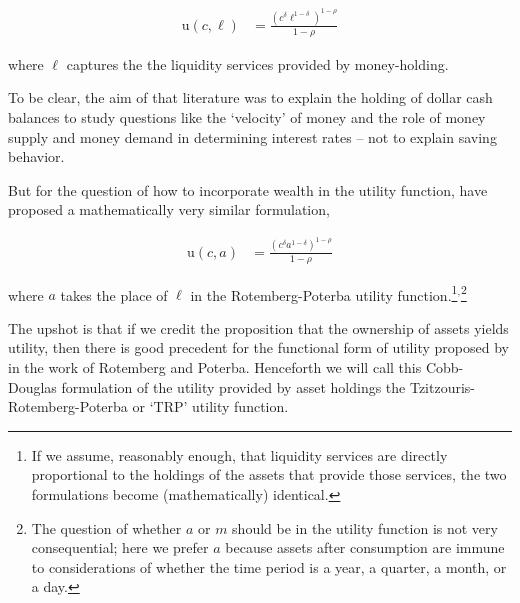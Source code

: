 \documentclass{article}
\newcommand{\CRRA}{\rho}
\newcommand{\uFunc}{\mathrm{u}}
\newcommand{\cNrm}{c}
\newcommand{\aNrm}{a}
\newcommand{\mNrm}{m}
\begin{document}
\begin{align}
    \uFunc(\cNrm,\ell) & = \frac{\left(
        \cNrm^{\delta}\ell^{1-\delta}
        \right)^{1-\CRRA}}{1-\CRRA}
\end{align}

where $\ell$ captures the the liquidity services provided by money-holding.

To be clear, the aim of that literature was to explain the holding of dollar cash balances to study questions like the `velocity' of money and the role of money supply and money demand in determining interest rates -- not to explain saving behavior.

But for the question of how to incorporate wealth in the utility function, \cite{Tzitzouris_2024} have proposed a mathematically very similar formulation,

\begin{align}
    \uFunc(\cNrm,\aNrm) & = \frac{\left(
        \cNrm^{\delta}\aNrm^{1-\delta}
        \right)^{1-\CRRA}}{1-\CRRA}
\end{align}

where $\aNrm$ takes the place of $\ell$ in the Rotemberg-Poterba utility function.\footnote{If we assume, reasonably enough, that liquidity services are directly proportional to the holdings of the assets that provide those services, the two formulations become (mathematically) identical.}$^{,}$\footnote{The question of whether $\aNrm$ or $\mNrm$ should be in the utility function is not very consequential; here we prefer $\aNrm$ because assets after consumption are immune to considerations of whether the time period is a year, a quarter, a month, or a day.}

The upshot is that if we credit the proposition that the ownership of assets yields utility, then there is good precedent for the functional form of utility proposed by \cite{Tzitzouris_2024} in the work of Rotemberg and Poterba. Henceforth we will call this Cobb-Douglas formulation of the utility provided by asset holdings the Tzitzouris-Rotemberg-Poterba or `TRP' utility function.

\end{document}
